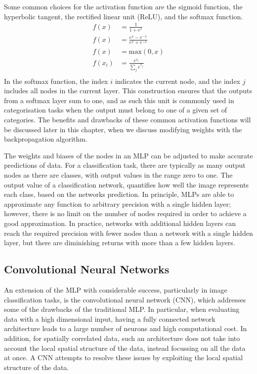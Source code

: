 Some common choices for the activation function are the sigmoid function, the
hyperbolic tangent, the rectified linear unit (ReLU), and the softmax 
function\cite{Lecun2015, He2015, Szegedy2015}.
\begin{align}
	\tag{Sigmoid} f(x) &= \frac{1}{1+e^x} \\
	\tag{Tanh}    f(x) &= \frac{e^x - e^{-x}}{e^x+e^{-x}} \\
	\tag{ReLU}    f(x) &= \mbox{max}\left( 0, x \right) \\
	\tag{Softmax} f(x_i) &= \frac{e^{x_i}}{\displaystyle\sum_j e^{x_j}} \\
	\label{eqn:losses}
\end{align}
In the softmax function, the index $i$ indicates the current node, and the index
$j$ includes all nodes in the current layer. This construction ensures that 
the outputs from a softmax layer sum to one, and as such this unit is commonly 
used in categorisation tasks when the output must belong to one of a given set 
of categories. The benefits and drawbacks of these common activation functions 
will be discussed later in this chapter, when we discuss modifying weights 
with the backpropagation algorithm.

The weights and biases of the nodes in an MLP can be adjusted to make accurate 
predictions of data. For a classification task, there are typically as many
output nodes as there are classes, with output values in the range zero to one. 
The output value of a classification network, quantifies how well the image
represents each class, based on the networks prediction. In principle, MLPs 
are able to approximate any function to arbitrary precision with a 
single hidden layer\cite{Cybenko1989ApproximationBS}; however, there is no 
limit on the number of nodes required in order to achieve a good 
approximation. In practice, networks with additional hidden layers can reach 
the required precision with fewer nodes than a network with a single hidden 
layer, but there are diminishing returns with more than a few hidden 
layers\cite{Reed1999, Lecun2015}.

\subsection{Convolutional Neural Networks}
An extension of the MLP with considerable success, particularly in image 
classification tasks, is the convolutional neural network 
(CNN)\cite{Jackel2008, Szegedy2015, 5537907}, which addresses some of the drawbacks 
of the traditional MLP. In particular, when evaluating data with a high 
dimensional input, having a fully connected network architecture leads to a 
large number of neurons and high computational cost. In addition, for 
spatially correlated data, such an architecture does not take into account the 
local spatial structure of the data, instead focussing on all the data at 
once. A CNN attempts to resolve these issues by exploiting the local spatial 
structure of the data.

